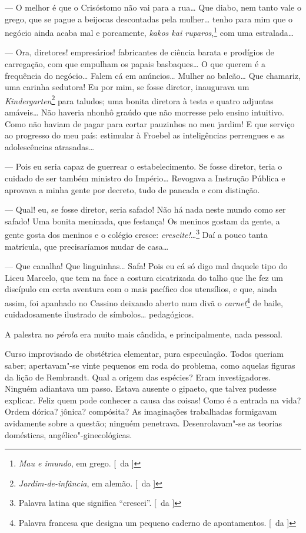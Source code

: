 --- O melhor é que o Crisóstomo não vai para a rua\ldots{} Que diabo, nem
tanto vale o grego, que se pague a beijocas descontadas pela mulher\ldots{}
tenho para mim que o negócio ainda acaba mal e porcamente, \textit{kakos kai
ruparos},\footnote{ \textit{Mau e imundo}, em grego. [~da ]} com uma estralada\ldots{} 

--- Ora, diretores! empresários!
fabricantes de ciência barata e prodígios de carregação, com que
empulham os papais basbaques\ldots{} O que querem é a frequência do
negócio\ldots{} Falem cá em anúncios\ldots{} Mulher ao balcão\ldots{} Que chamariz,
uma carinha sedutora! Eu por mim, se fosse diretor, inaugurava um
\textit{Kindergarten}\footnote{ \textit{Jardim-de-infância}, em alemão. [~da ]} 
para taludos; uma bonita diretora à testa e quatro
adjuntas amáveis\ldots{} Não haveria nhonhô graúdo que não morresse pelo
ensino intuitivo. Como não haviam de pagar para cortar pauzinhos no meu
jardim! E que serviço ao progresso do meu país: estimular à Froebel as
inteligências perrengues e as adolescências atrasadas\ldots{} 

--- Pois eu seria capaz de guerrear o estabelecimento. Se fosse diretor, 
teria o cuidado de ser também ministro do Império\ldots{} Revogava a Instrução
Pública e aprovava a minha gente por decreto, tudo de pancada e com
distinção. 

--- Qual! eu, se fosse diretor, seria safado! Não há nada
neste mundo como ser safado! Uma bonita meninada, que festança! Os
meninos gostam da gente, a gente gosta dos meninos e o colégio cresce:
\textit{crescite!}\ldots{}\footnote{ Palavra latina que significa ``crescei''. 
[~da ]} Daí a pouco tanta matrícula, que precisaríamos mudar de casa\ldots{} 

--- Que canalha! Que linguinhas\ldots{} Safa! Pois eu cá só digo mal
daquele tipo do Liceu Marcelo, que tem na face a costura cicatrizada do
talho que lhe fez um discípulo em certa aventura com o mais pacífico
dos utensílios, e que, ainda assim, foi apanhado no Cassino deixando
aberto num divã o \textit{carnet}\footnote{ Palavra francesa que designa 
um pequeno caderno de apontamentos. [~da ]} de baile, cuidadosamente ilustrado de
símbolos\ldots{} pedagógicos. 

A palestra no \textit{pérola} era muito mais cândida, e
principalmente, nada pessoal. 

Curso improvisado de obstétrica
elementar, pura especulação. Todos queriam saber; apertavam"-se vinte
pequenos em roda do problema, como aquelas figuras da lição de
Rembrandt. Qual a origem das espécies? Eram investigadores. Ninguém
adiantava um passo. Estava ausente o gipaeto, que talvez pudesse
explicar. Feliz quem pode conhecer a causa das coisas! Como é a entrada
na vida? Ordem dórica? jônica? compósita? As imaginações trabalhadas
formigavam avidamente sobre a questão; ninguém penetrava.
Desenrolavam"-se as teorias domésticas, angélico"-ginecológicas.

